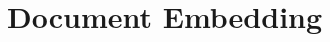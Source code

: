 \documentclass[../../Thesis.tex]{subfiles}
\begin{document}
\section{Document Embedding}
\end{document}
